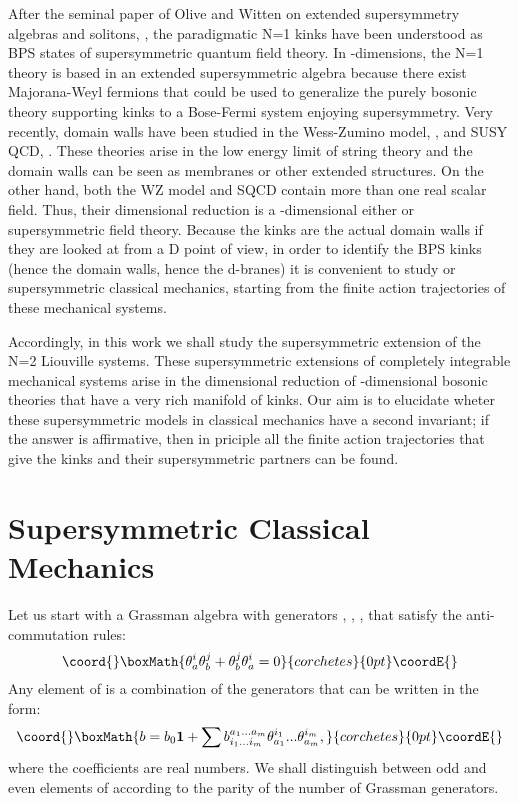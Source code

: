 \documentclass[a4paper,11pt,twoside]{article}
\begin{document}
After the seminal paper of Olive and Witten on extended
supersymmetry algebras and solitons, \cite{Oliv}, the paradigmatic
N=1 kinks have been understood as BPS states of \coordHE{}
supersymmetric quantum field theory. In \coordHE{}-dimensions, the
N=1 theory is based in an extended supersymmetric algebra because
there exist Majorana-Weyl fermions that could be used to
generalize the purely bosonic theory supporting kinks to a
Bose-Fermi system enjoying supersymmetry. Very recently, domain
walls have been studied in the Wess-Zumino model, \cite{Gibb}, and
\coordHE{} SUSY QCD, \cite{Vali}. These theories arise in the
low energy limit of string theory and the domain walls can be seen
as membranes or other extended structures. On the other hand, both
the WZ model and SQCD contain more than one real scalar field.
Thus, their dimensional reduction is a \coordHE{}-dimensional either
\coordHE{} or \coordHE{} supersymmetric field theory. Because
the kinks are the actual domain walls if they are looked at from a
\coordHE{}D point of view, in order to identify the BPS kinks (hence
the domain walls, hence the d-branes) it is convenient to study
\coordHE{} or \coordHE{} supersymmetric classical mechanics,
starting from the finite action trajectories of these mechanical
systems.

Accordingly, in this work we shall study the \coordHE{}
supersymmetric extension of the N=2 Liouville systems. These
supersymmetric extensions of completely integrable mechanical
systems arise in the dimensional reduction of \coordHE{}-dimensional
bosonic theories that have a very rich manifold of kinks. Our aim
is to elucidate wheter these supersymmetric models in classical
mechanics have a second invariant; if the answer is affirmative,
then in priciple all the finite action trajectories that give the
kinks and their supersymmetric partners can be found.

\section{Supersymmetric Classical Mechanics}

Let us start with a Grassman algebra \coordHE{} with generators
\coordHE{}, \coordHE{}, \coordHE{},  that satisfy the
anti-commutation rules:
\[\coord{}\boxMath{
\theta_a^i \theta_b^j + \theta_b^j \theta_a^i=0
}{corchetes}{0pt}\coordE{}\]
Any element of \coordHE{} is a combination of the \coordHE{}
generators \coordHE{} that can be written in the form:
\[\coord{}\boxMath{
b=b_0 {\bf 1}+\sum b_{i_1...i_m}^{a_1...a_m}
\theta_{a_1}^{i_1}...\theta_{a_m}^{i_m},
}{corchetes}{0pt}\coordE{}\]
where the coefficients \coordHE{} are real
numbers. We shall distinguish between odd and even elements of
\coordHE{} according to the parity of the number of Grassman
generators.
\end{document}
